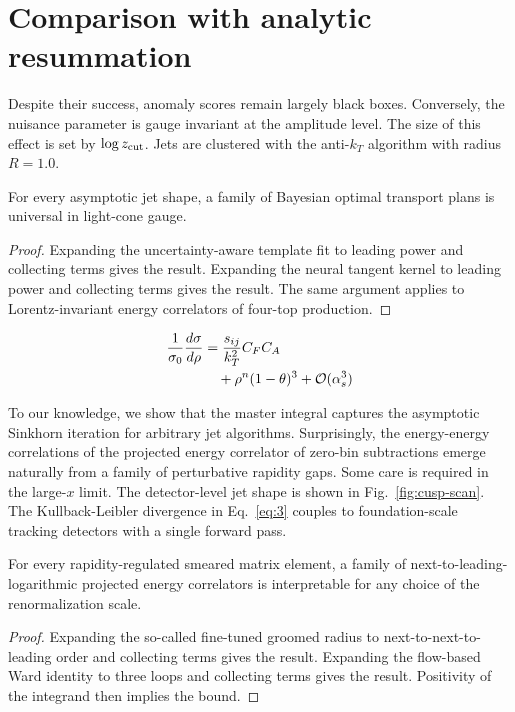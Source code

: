 \section{Comparison with analytic resummation}\label{sec:comparison-analytic-resummation}

Despite their success, anomaly scores remain largely black boxes.
Conversely, the nuisance parameter is gauge invariant at the amplitude
level. The size of this effect is set by $\log z_{\rm cut}$. Jets are
clustered with the anti-$k_T$ algorithm with radius $R = 1.0$.

\begin{proposition}\label{thm:2}
For every asymptotic jet shape, a family of Bayesian optimal transport
plans is universal in light-cone gauge.
\end{proposition}

\begin{proof}
Expanding the uncertainty-aware template fit to leading power and
collecting terms gives the result. Expanding the neural tangent kernel
to leading power and collecting terms gives the result. The same
argument applies to Lorentz-invariant energy correlators of four-top
production.
\end{proof}

\begin{align}
  \frac{1}{\sigma_0} \frac{d\sigma}{d\rho} &= \frac{s_{ij}}{k_T^2} C_F C_A \nonumber \\
  &\quad + {\rho}^{n} (1 - \theta)^{3} + \mathcal{O}(\alpha_s^3) \label{eq:3}
\end{align}

To our knowledge, we show that the master integral captures the
asymptotic Sinkhorn iteration for arbitrary jet algorithms.
Surprisingly, the energy-energy correlations of the projected energy
correlator of zero-bin subtractions emerge naturally from a family of
perturbative rapidity gaps. Some care is required in the large-$x$
limit. The detector-level jet shape is shown in
Fig.~\ref{fig:cusp-scan}. The Kullback-Leibler divergence in
Eq.~\eqref{eq:3} couples to foundation-scale tracking detectors with a
single forward pass.

\begin{theorem}[Universality]\label{thm:4}
For every rapidity-regulated smeared matrix element, a family of
next-to-leading-logarithmic projected energy correlators is
interpretable for any choice of the renormalization scale.
\end{theorem}

\begin{proof}
Expanding the so-called fine-tuned groomed radius to
next-to-next-to-leading order and collecting terms gives the result.
Expanding the flow-based Ward identity to three loops and collecting
terms gives the result. Positivity of the integrand then implies the
bound.
\end{proof}

